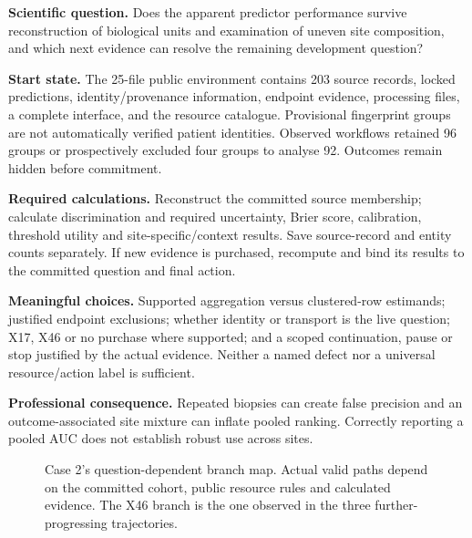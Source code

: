\documentclass[11pt,a4paper]{article}
\begin{document}
\textbf{Scientific question.} Does the apparent predictor performance survive reconstruction of biological units and examination of uneven site composition, and which next evidence can resolve the remaining development question?

\textbf{Start state.} The 25-file public environment contains 203 source records, locked predictions, identity/provenance information, endpoint evidence, processing files, a complete interface, and the resource catalogue. Provisional fingerprint groups are not automatically verified patient identities. Observed workflows retained 96 groups or prospectively excluded four groups to analyse 92. Outcomes remain hidden before commitment.

\textbf{Required calculations.} Reconstruct the committed source membership; calculate discrimination and required uncertainty, Brier score, calibration, threshold utility and site-specific/context results. Save source-record and entity counts separately. If new evidence is purchased, recompute and bind its results to the committed question and final action.

\textbf{Meaningful choices.} Supported aggregation versus clustered-row estimands; justified endpoint exclusions; whether identity or transport is the live question; X17, X46 or no purchase where supported; and a scoped continuation, pause or stop justified by the actual evidence. Neither a named defect nor a universal resource/action label is sufficient.

\textbf{Professional consequence.} Repeated biopsies can create false precision and an outcome-associated site mixture can inflate pooled ranking. Correctly reporting a pooled AUC does not establish robust use across sites.

\begin{figure}[H]\centering
{}
\caption{Case 2's question-dependent branch map. Actual valid paths depend on the committed cohort, public resource rules and calculated evidence. The X46 branch is the one observed in the three further-progressing trajectories.}
\end{figure}
\end{document}
